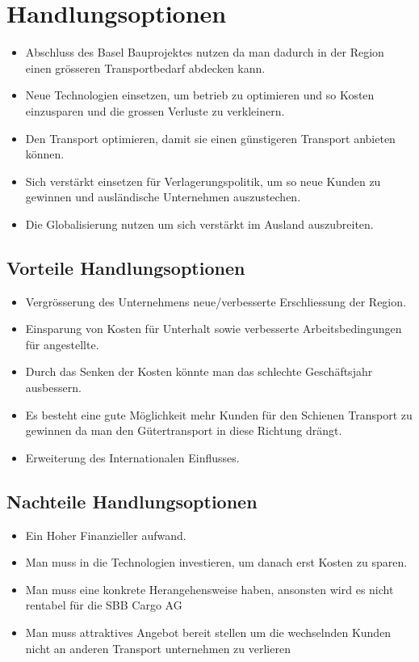 \documentclass{article}
\begin{document}
\section{Handlungsoptionen}

\begin{itemize}
    \item Abschluss des Basel Bauprojektes nutzen da man dadurch in der Region einen grösseren Transportbedarf abdecken kann. 
    \item Neue Technologien einsetzen, um betrieb zu optimieren und so Kosten einzusparen und die grossen Verluste zu verkleinern. 
    \item Den Transport optimieren, damit sie einen günstigeren Transport anbieten können. 
    \item Sich verstärkt einsetzen für Verlagerungspolitik, um so neue Kunden zu gewinnen und ausländische Unternehmen auszustechen. 
    \item Die Globalisierung nutzen um sich verstärkt im Ausland auszubreiten. 
\end{itemize}

\subsection{Vorteile Handlungsoptionen}
\begin{itemize}
    \item Vergrösserung des Unternehmens neue/verbesserte Erschliessung der Region. 
    \item Einsparung von Kosten für Unterhalt sowie verbesserte Arbeitsbedingungen für angestellte. 
    \item Durch das Senken der Kosten könnte man das schlechte Geschäftsjahr ausbessern. 
    \item Es besteht eine gute Möglichkeit mehr Kunden für den Schienen Transport zu gewinnen da man den Gütertransport in diese Richtung drängt. 
    \item Erweiterung des Internationalen Einflusses. 
\end{itemize}

\subsection{Nachteile Handlungsoptionen}
\begin{itemize}
    \item Ein Hoher Finanzieller aufwand.
    \item Man muss in die Technologien investieren, um danach erst Kosten zu sparen. 
    \item Man muss eine konkrete Herangehensweise haben, ansonsten wird es nicht rentabel für die SBB Cargo AG 
    \item Man muss attraktives Angebot bereit stellen um die wechselnden Kunden nicht an anderen Transport unternehmen zu verlieren 
\end{itemize}
\end{document}
